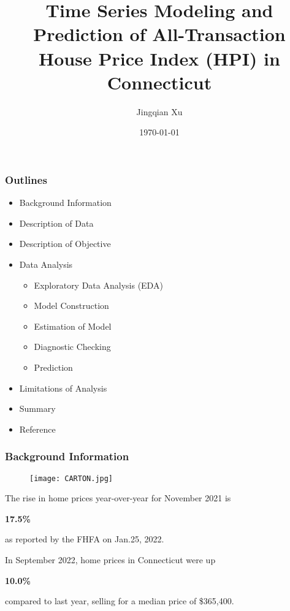 \documentclass{beamer}
\title{Time Series Modeling and Prediction of All-Transaction House Price Index (HPI) in Connecticut}\\
\author{Jingqian Xu}
\date{\today}
\begin{document}
\begin{frame}
\titlepage
\end{frame}

\begin{frame}
\frametitle{Outlines}
\begin{itemize}
    \item Background Information
    \item Description of Data
    \item Description of Objective
    \item Data Analysis
    \begin{itemize}
        \item Exploratory Data Analysis (EDA)
        \item Model Construction
        \item Estimation of Model
        \item Diagnostic Checking
        \item Prediction
    \end{itemize}
    \item Limitations of Analysis
    \item Summary
    \item Reference 
    
\end{itemize}
\end{frame}

\begin{frame}
\frametitle{Background Information}
\begin{figure}
    \centering
    \texttt{[image: CARTON.jpg]}
\end{figure}


The rise in home prices year-over-year for November 2021 is \begin{huge}
\textbf{\textcolor{col1}{17.5\%}}
\end{huge} as reported by the FHFA on Jan.25, 2022.

In September 2022, home prices in Connecticut were up  \begin{huge}
\textbf{\textcolor{col2}{10.0\%}}
\end{huge} compared to last year, selling for a median price of \$365,400. 
\end{frame}
\end{document}
